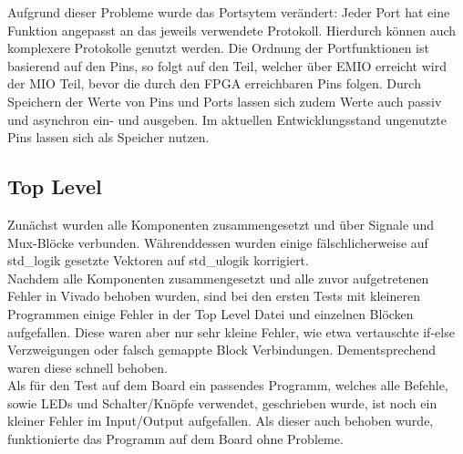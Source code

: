 \documentclass{scrartcl}
\begin{document}
Aufgrund dieser Probleme wurde das Portsytem verändert: Jeder Port hat eine Funktion angepasst an das jeweils verwendete Protokoll. Hierdurch können auch komplexere Protokolle genutzt werden. Die Ordnung der Portfunktionen ist basierend auf den Pins, so folgt auf den Teil, welcher über EMIO erreicht wird der MIO Teil, bevor die durch den FPGA erreichbaren Pins folgen. Durch Speichern der Werte von Pins und Ports lassen sich zudem Werte auch passiv und asynchron ein- und ausgeben. Im aktuellen Entwicklungsstand ungenutzte Pins lassen sich als Speicher nutzen.
\subsection{Top Level}
Zunächst wurden alle Komponenten zusammengesetzt und über Signale und Mux-Blöcke verbunden. Währenddessen wurden einige fälschlicherweise auf  std\_logik gesetzte Vektoren auf std\_ulogik korrigiert. \\
Nachdem alle Komponenten zusammengesetzt und alle zuvor aufgetretenen Fehler in Vivado
behoben wurden,
sind bei den ersten Tests mit kleineren Programmen einige Fehler in der Top Level Datei und einzelnen Blöcken aufgefallen. Diese waren aber nur sehr kleine Fehler, wie etwa vertauschte if-else Verzweigungen
oder falsch gemappte Block Verbindungen. Dementsprechend waren diese schnell behoben. \\
Als für den Test
auf dem Board ein passendes Programm, welches alle Befehle, sowie LEDs und Schalter/Knöpfe verwendet,
geschrieben wurde, ist noch ein kleiner Fehler im Input/Output aufgefallen.
Als dieser auch behoben wurde, funktionierte das Programm auf dem Board ohne Probleme.
\end{document}
